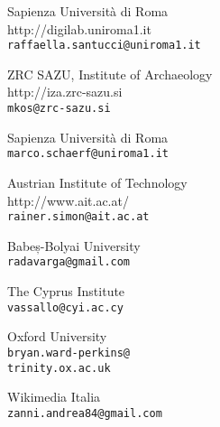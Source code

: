 \begin{contributors}
{ Sapienza Università di Roma  \\
{http://digilab.uniroma1.it }\\
\texttt{raffaella.santucci@uniroma1.it	}
}


{  ZRC SAZU, Institute of Archaeology \\
{http://iza.zrc-sazu.si}	\\
\texttt{mkos@zrc-sazu.si	}
}


{Sapienza Università di Roma	   \\
\texttt{marco.schaerf@uniroma1.it	}
}
	

{  Austrian Institute of Technology \\
{http://www.ait.ac.at/}	\\
\texttt{rainer.simon@ait.ac.at}
}
	
		
		
		

{  Babeș-Bolyai University	 \\
\texttt{radavarga@gmail.com}}
		


{  The Cyprus Institute	 \\
\texttt{vassallo@cyi.ac.cy	}
}


{Oxford University	   \\
\texttt{bryan.ward-perkins@\\trinity.ox.ac.uk}
}



{ Wikimedia Italia	  \\
\texttt{zanni.andrea84@gmail.com}
}



		


\end{contributors}